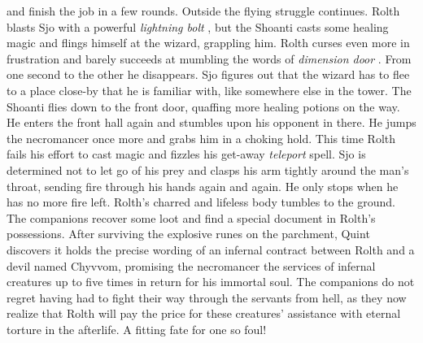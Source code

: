 and finish the job in a few rounds. Outside the flying struggle continues. Rolth blasts Sjo with a powerful {\itshape lightning bolt} , but the Shoanti casts some healing magic and flings himself at the wizard, grappling him. Rolth curses even more in frustration and barely succeeds at mumbling the words of  {\itshape dimension door} . From one second to the other he disappears. Sjo figures out that the wizard has to flee to a place close-by that he is familiar with, like somewhere else in the tower. The Shoanti flies down to the front door, quaffing more healing potions on the way. He enters the front hall again and stumbles upon his opponent in there. He jumps the necromancer once more and grabs him in a choking hold. This time Rolth fails his effort to cast magic and fizzles his get-away  {\itshape teleport} spell. Sjo is determined not to let go of his prey and clasps his arm tightly around the man's throat, sending fire through his hands again and again. He only stops when he has no more fire left. Rolth's charred and lifeless body tumbles to the ground. The companions recover some loot and find a special document in Rolth's possessions. After surviving the explosive runes on the parchment, Quint discovers it holds the precise wording of an infernal contract between Rolth and a devil named Chyvvom, promising the necromancer the services of infernal creatures up to five times in return for his immortal soul. The companions do not regret having had to fight their way through the servants from hell, as they now realize that Rolth will pay the price for these creatures' assistance with eternal torture in the afterlife. A fitting fate for one so foul!\\

